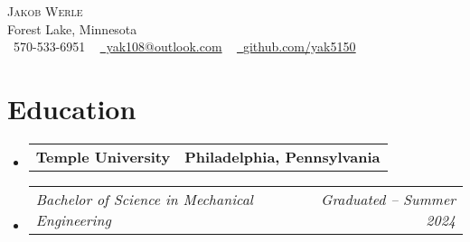 \documentclass[letterpaper,11pt]{article}
\makeatletter
\newcommand{\company}[2]{
  \vspace{-2pt}\item
  \begin{tabular*}{1.0\textwidth}[t]{l@{\extracolsep{\fill}}r}
    \textbf{#1} & \textbf{\small #2} \\
  \end{tabular*}\vspace{-18pt}
}
\newcommand{\role}[2]{
  \vspace{-5pt}\item
  \begin{tabular*}{1.0\textwidth}[t]{l@{\extracolsep{\fill}}r}
    \textit{\small#1} & \textit{\small #2} \\
  \end{tabular*}\vspace{-20pt}
}
\newcommand{\companyListStart}{
  \begin{itemize}[leftmargin=0.0in, label={}]
}
\newcommand{\companyListEnd}{
  \end{itemize}
}
\makeatother
\begin{document}
\begin{center}
    {\Huge \scshape Jakob Werle} \\ \vspace{1pt}
    Forest Lake, Minnesota \\ \vspace{1pt}
    \small \raisebox{-0.1\height}\faPhone\ 570-533-6951 ~ \href{mailto:jakob.werle@temple.edu}{\raisebox{-0.2\height}\faEnvelope\ yak108@outlook.com} ~ 
    \href{https://github.com/yak5150}{\raisebox{-0.2\height}\faGithub\ \underline{github.com/yak5150}}
    \vspace{-8pt}
\end{center}
\section{Education}
  \companyListStart
    \company{Temple University}{Philadelphia, Pennsylvania}
      \role{Bachelor of Science in Mechanical Engineering}{Graduated -- Summer 2024}
  \companyListEnd
\vspace{-12pt}

\end{document}
